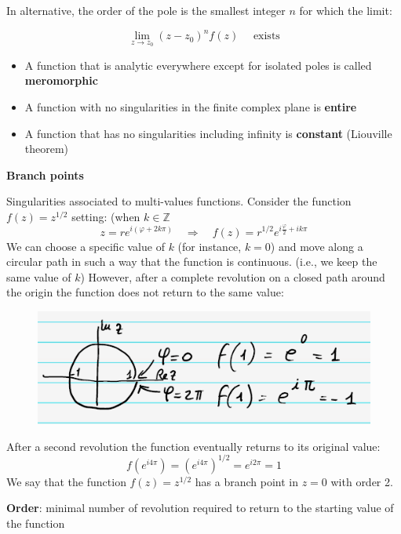 \documentclass{article}
\begin{document}
\noindent
In alternative, the order of the pole is the smallest integer $n$ for which the limit:

\begin{equation}
    \lim_{z \rightarrow z_0} (z-z_0)^n f(z) \quad \text{ exists}
\end{equation}
\begin{itemize}
    \item A function that is analytic everywhere except for isolated poles is called \textbf{meromorphic}
    \item A function with no singularities in the finite complex plane is \textbf{entire}
    \item A function that has no singularities including infinity is \textbf{constant} (Liouville theorem)
\end{itemize}

\newpage

\noindent
\textbf{Branch points}

\noindent
Singularities associated to multi-values functions. Consider the function $f(z) = z^{1/2}$ setting: (when $k \in \mathbb{Z}$
\begin{equation}
    z = r e^{i(\varphi + 2k\pi)}
\quad \Rightarrow \quad f(z) = r^{1/2} e^{i\frac{\varphi}{2} + i k\pi}
\end{equation}
We can choose a specific value of $k$ (for instance, $k=0$) and move along a circular path in such a way that the function is continuous. (i.e., we keep the same value of $k$) However, after a complete revolution on a closed path around the origin the function does not return to the same value:
 \begin{figure}[h]
     \centering
     \includegraphics[width=0.5\linewidth]{fig20.png}
 \end{figure}

\noindent
After a second revolution the function eventually returns to its original value:
\begin{equation}
    f\left(e^{i 4\pi}\right) = \left(e^{i 4\pi}\right)^{1/2} = e^{i 2\pi} = 1
\end{equation}
We say that the function $f(z)=z^{1/2}$ has a branch point in $z=0$ with order 2.

\noindent
\textbf{Order}: minimal number of revolution required to return to the starting value of the function
\end{document}
